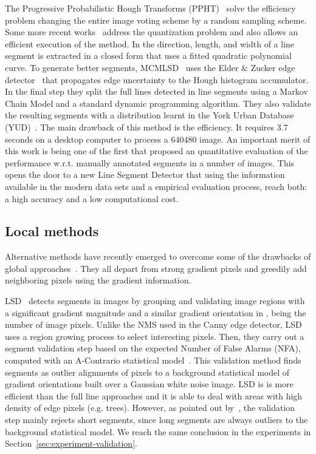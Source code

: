 \documentclass[preprint,12pt]{elsarticle}
\begin{document}
The Progressive Probabilistic Hough Transforms (PPHT)~\cite{KIRYATI1991303, matas2000robust} solve the efficiency problem changing the entire image voting scheme by a random sampling scheme. 
Some more recent works~\cite{tal2012accurate,fernandes2008real} address the quantization problem and also allows an efficient execution of the method. 
In \cite{XU20154012} the direction, length, and width of a line segment is extracted in a closed form that uses a fitted quadratic polynomial curve. To generate better segments, MCMLSD~\cite{almazan2017mcmlsd} 
uses the Elder \& Zucker edge detector~\cite{elder1998edge} 
that propagates edge uncertainty to the Hough histogram accumulator. 
In the final step they split the full lines detected in line segments using a Markov Chain Model and a standard dynamic programming algorithm. They also validate the resulting segments with a distribution learnt in the York Urban Database (YUD)~\cite{denis2008efficient}. 
The main drawback of this method is the efficiency. It requires 3.7 seconds on a desktop computer to process a 640480 image. 
An important merit of this work is being one of the first that proposed an quantitative evaluation of the performance w.r.t. manually annotated segments in a number of images. 
This opens the door to a new Line Segment Detector that using the information available in the modern data sets and a empirical evaluation process, reach both: a high accuracy and a low computational cost.

\subsection{Local methods} \label{sec:local_properties_soa}

Alternative methods have recently emerged to overcome some of the drawbacks of global approaches~\cite{grompone2010lsd,akinlar2011edlines,cho2017novel,zhang2021ag3line}. They all depart from strong gradient pixels and greedily add neighboring pixels using the gradient information. 

LSD~\cite{grompone2010lsd} detects segments in images by grouping and validating image regions with a significant gradient magnitude and a similar gradient orientation in , being  the number of image pixels. Unlike the NMS used in the Canny edge detector, LSD uses a region growing process to select interesting pixels. Then, they carry out a segment validation step based on the expected Number of False Alarms (NFA), computed with an A-Contrario statistical model~\cite{desolneux2000meaningful}. 
This validation method finds segments as outlier alignments of pixels to a background statistical model of gradient orientations built over a Gaussian white noise image. 
LSD is is more efficient than the full line approaches and it is able to deal with areas with high density of edge pixels (e.g. trees). However, as pointed out by~\cite{akinlar2011edlines}, the validation step mainly rejects short segments, since long segments are always outliers to the background statistical model. We reach the same conclusion in the experiments in Section~\ref{sec:experiment-validation}.
\end{document}
